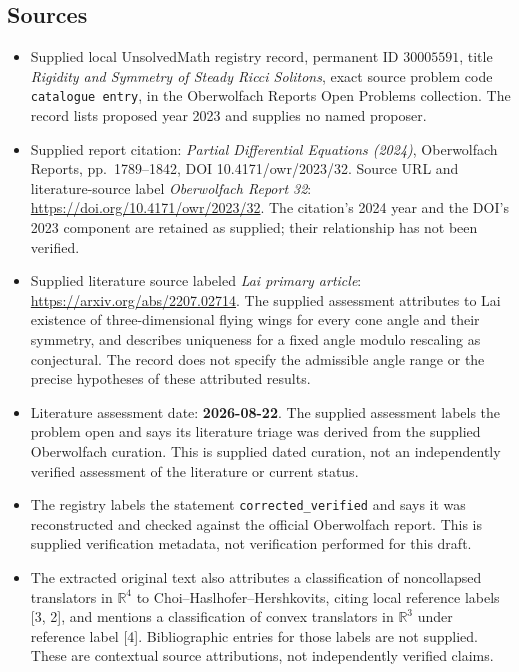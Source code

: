 \documentclass[11pt]{article}
\newcommand{\R}{\mathbb{R}}
\begin{document}
\subsection{Sources}
\begin{itemize}
\item Supplied local UnsolvedMath registry record, permanent ID $30005591$, title \emph{Rigidity and Symmetry of Steady Ricci Solitons}, exact source problem code \texttt{catalogue entry}, in the Oberwolfach Reports Open Problems collection. The record lists proposed year 2023 and supplies no named proposer.
\item Supplied report citation: \emph{Partial Differential Equations (2024)}, Oberwolfach Reports, pp.~1789--1842, DOI 10.4171/owr/2023/32. Source URL and literature-source label \emph{Oberwolfach Report 32}: \url{https://doi.org/10.4171/owr/2023/32}. The citation's 2024 year and the DOI's 2023 component are retained as supplied; their relationship has not been verified.
\item Supplied literature source labeled \emph{Lai primary article}: \url{https://arxiv.org/abs/2207.02714}. The supplied assessment attributes to Lai existence of three-dimensional flying wings for every cone angle and their symmetry, and describes uniqueness for a fixed angle modulo rescaling as conjectural. The record does not specify the admissible angle range or the precise hypotheses of these attributed results.
\item Literature assessment date: \textbf{2026-08-22}. The supplied assessment labels the problem open and says its literature triage was derived from the supplied Oberwolfach curation. This is supplied dated curation, not an independently verified assessment of the literature or current status.
\item The registry labels the statement \texttt{corrected\_verified} and says it was reconstructed and checked against the official Oberwolfach report. This is supplied verification metadata, not verification performed for this draft.
\item The extracted original text also attributes a classification of noncollapsed translators in $\R^4$ to Choi--Haslhofer--Hershkovits, citing local reference labels [3, 2], and mentions a classification of convex translators in $\R^3$ under reference label [4]. Bibliographic entries for those labels are not supplied. These are contextual source attributions, not independently verified claims.
\end{itemize}
\end{document}
